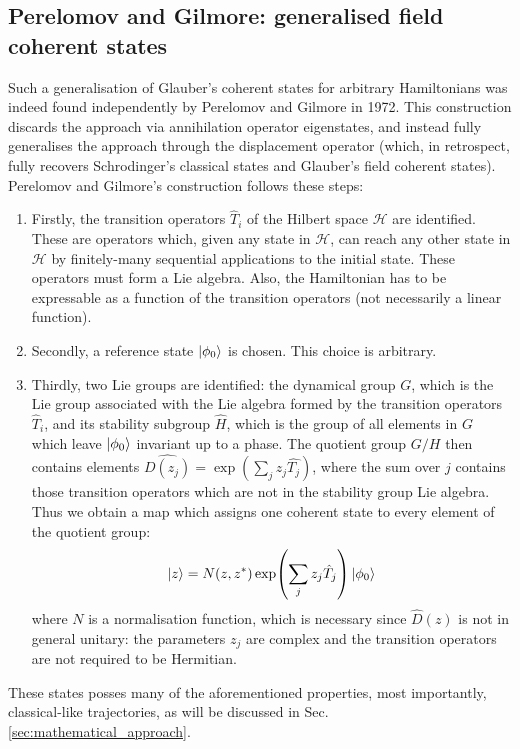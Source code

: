 \subsection{Perelomov and Gilmore: generalised field coherent states}
Such a generalisation of Glauber's coherent states for arbitrary Hamiltonians was indeed found independently by Perelomov \cite{perelomov_og} and Gilmore \cite{gilmore_og} in 1972. This construction discards the approach via annihilation operator eigenstates, and instead fully generalises the approach through the displacement operator (which, in retrospect, fully recovers Schrodinger's classical states and Glauber's field coherent states). Perelomov and Gilmore's construction follows these steps:
\begin{enumerate}
	\item Firstly, the transition operators $\hat{T}_i$ of the Hilbert space $\mathcal{H}$ are identified. These are operators which, given any state in $\mathcal{H}$, can reach any other state in $\mathcal{H}$ by finitely-many sequential applications to the initial state. These operators must form a Lie algebra. Also, the Hamiltonian has to be expressable as a function of the transition operators (not necessarily a linear function).
	\item Secondly, a reference state $\ket{\phi_0}$ is chosen. This choice is arbitrary.
	\item Thirdly, two Lie groups are identified: the dynamical group $G$, which is the Lie group associated with the Lie algebra formed by the transition operators $\hat{T}_i$, and its stability subgroup $\hat{H}$, which is the group of all elements in $G$ which leave $\ket{\phi_0}$ invariant up to a phase. The quotient group $G/H$ then contains elements $\hat{D(z_j)}=\exp(\sum_j z_j\hat{T_j})$, where the sum over $j$ contains those transition operators which are not in the stability group Lie algebra. Thus we obtain a map which assigns one coherent state to every element of the quotient group:
	\begin{equation}
	\ket{z}=N(z, z^*)\exp(\sum_jz_j\hat{T}_j)\ket{\phi_0}
	\end{equation}
	where $N$ is a normalisation function, which is necessary since $\hat{D}(z)$ is not in general unitary: the parameters $z_j$ are complex and the transition operators are not required to be Hermitian.
\end{enumerate}
These states posses many of the aforementioned properties, most importantly, classical-like trajectories, as will be discussed in Sec. \ref{sec:mathematical_approach}.

